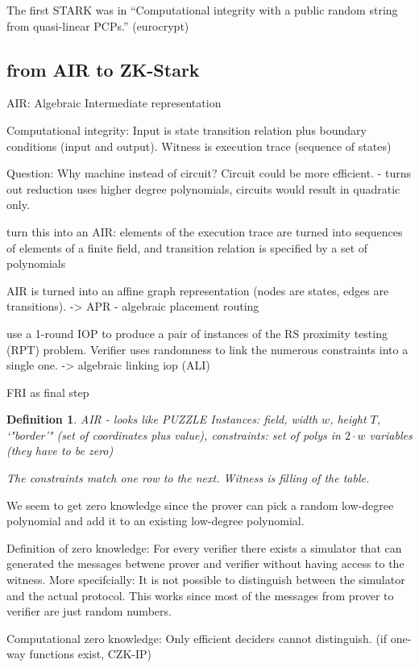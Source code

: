 \documentclass[11pt,letterpaper]{article}
\newtheorem{definition}[dummytheorem]{Definition}
\begin{document}
The first STARK was in "`Computational integrity with a public random string from quasi-linear PCPs."' (eurocrypt)

\subsection{from AIR to ZK-Stark}

AIR: Algebraic Intermediate representation

Computational integrity: Input is state transition relation plus boundary conditions (input and output). Witness is execution trace (sequence of states)

Question: Why machine instead of circuit? Circuit could be more efficient. - turns out reduction uses higher degree polynomials, circuits would result in quadratic only.

turn this into an AIR: elements of the execution trace are turned into sequences of elements of a finite field, and transition relation is
specified by a set of polynomials

AIR is turned into an affine graph representation (nodes are states, edges are transitions). -> APR - algebraic placement routing

use a 1-round IOP to produce a pair of instances of the RS proximity testing (RPT) problem.
Verifier uses randomness to link the numerous constraints into a single one. -> algebraic linking iop (ALI)

FRI as final step

\begin{definition}
AIR - looks like PUZZLE
Instances: field, width $w$, height $T$, `"border'" (set of coordinates plus value), constraints: set of polys in $2\cdot w$ variables
(they have to be zero)

The constraints match one row to the next. Witness is filling of the table.
\end{definition}

We seem to get zero knowledge since the prover can pick a random low-degree polynomial and add it to an existing low-degree polynomial.

Definition of zero knowledge: For every verifier there exists a simulator that can generated the messages betwene prover and
verifier without having access to the witness. More specifcially: It is not possible to distinguish between the simulator and
the actual protocol. This works since most of the messages from prover to verifier are just
random numbers.

Computational zero knowledge: Only efficient deciders cannot distinguish. (if one-way functions exist, CZK-IP)
\end{document}
